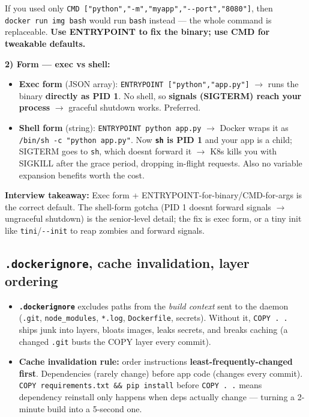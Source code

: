 \documentclass[11pt]{article}
\providecommand{\tightlist}{\setlength{\itemsep}{1pt}\setlength{\parskip}{0pt}}
\begin{document}
If you used only \texttt{CMD\ {[}"python","-m","myapp","-\/-port","8080"{]}}, then \texttt{docker\ run\ img\ bash} would run \texttt{bash} instead --- the whole command is replaceable. \textbf{Use ENTRYPOINT to fix the binary; use CMD for tweakable defaults.}

\textbf{2) Form --- exec vs shell:}

\begin{itemize}
\tightlist
\item
  \textbf{Exec form} (JSON array): \texttt{ENTRYPOINT\ {[}"python","app.py"{]}} \(\rightarrow\) runs the binary \textbf{directly as PID 1}. No shell, so \textbf{signals (SIGTERM) reach your process} \(\rightarrow\) graceful shutdown works. Preferred.
\item
  \textbf{Shell form} (string): \texttt{ENTRYPOINT\ python\ app.py} \(\rightarrow\) Docker wraps it as \texttt{/bin/sh\ -c\ "python\ app.py"}. Now \textbf{\texttt{sh} is PID 1} and your app is a child; SIGTERM goes to \texttt{sh}, which doesn\textquotesingle t forward it \(\rightarrow\) K8s kills you with SIGKILL after the grace period, dropping in-flight requests. Also no variable expansion benefits worth the cost.
\end{itemize}

\textbf{Interview takeaway:} Exec form + ENTRYPOINT-for-binary/CMD-for-args is the correct default. The shell-form gotcha (PID 1 doesn\textquotesingle t forward signals \(\rightarrow\) ungraceful shutdown) is the senior-level detail; the fix is exec form, or a tiny init like \texttt{tini}/\texttt{-\/-init} to reap zombies and forward signals.

\subsection{\texorpdfstring{\texttt{.dockerignore}, cache invalidation, layer ordering}{.dockerignore, cache invalidation, layer ordering}}\label{dockerignore-cache-invalidation-layer-ordering}

\begin{itemize}
\tightlist
\item
  \textbf{\texttt{.dockerignore}} excludes paths from the \emph{build context} sent to the daemon (\texttt{.git}, \texttt{node\_modules}, \texttt{*.log}, \texttt{Dockerfile}, secrets). Without it, \texttt{COPY\ .\ .} ships junk into layers, bloats images, leaks secrets, and breaks caching (a changed \texttt{.git} busts the COPY layer every commit).
\item
  \textbf{Cache invalidation rule:} order instructions \textbf{least-frequently-changed first}. Dependencies (rarely change) before app code (changes every commit). \texttt{COPY\ requirements.txt\ \&\&\ pip\ install} before \texttt{COPY\ .\ .} means dependency reinstall only happens when deps actually change --- turning a 2-minute build into a 5-second one.
\end{itemize}
\end{document}
